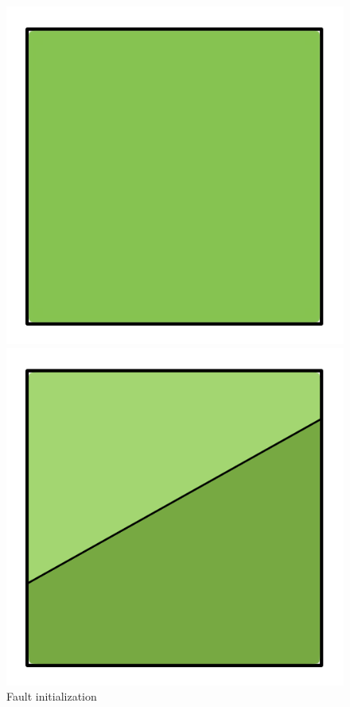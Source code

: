 \documentclass[11pt,a4paper,twoside,openright]{report}
\begin{document}
\begin{figure}[!htb]
  \includegraphics[width=\linewidth]{fault0.png}
  \caption{Fault initialization}\label{fig:fault0}
\endminipage\hfill
{}
  \includegraphics[width=\linewidth]{fault2.png}

\end{figure}
\end{document}
